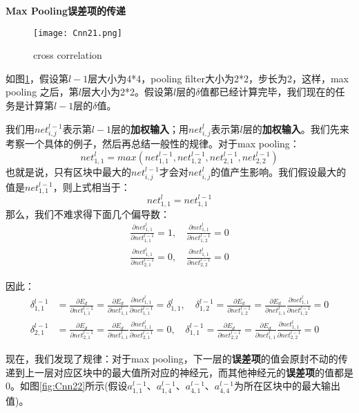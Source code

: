 \textbf{Max Pooling误差项的传递}

\begin{figure}[!h]
	\centering
	\texttt{[image: Cnn21.png]}
	\caption{cross correlation}
	\label{fig:Cnn21}
\end{figure}

如图\ref{fig:Cnn21}，假设第\(l-1\)层大小为4*4，pooling filter大小为2*2，步长为2，这样，max pooling 之后，第\(l\)层大小为2*2。假设第\(l\)层的\(\delta\)值都已经计算完毕，我们现在的任务是计算第\(l-1\)层的\(\delta\)值。


我们用\(net^{l-1}_{i,j}\)表示第\(l-1\)层的\textbf{加权输入}；用\(net^l_{i,j}\)表示第\(l\)层的\textbf{加权输入}。我们先来考察一个具体的例子，然后再总结一般性的规律。对于max pooling：
\[
	net^l_{1,1}=max(net^{l-1}_{1,1},net^{l-1}_{1,2},net^{l-1}_{2,1},net^{l-1}_{2,2})
\]
也就是说，只有区块中最大的\(net^{l-1}_{i,j}\)才会对\(net^l_{i,j}\)的值产生影响。我们假设最大的值是\(net^{l-1}_{1,1}\)，则上式相当于：
\[
	net^l_{1,1}=net^{l-1}_{1,1}
\]
那么，我们不难求得下面几个偏导数：
\begin{align*}
	\frac{\partial{net^l_{1,1}}}{\partial{net^{l-1}_{1,1}}}=1, \quad \frac{\partial{net^l_{1,1}}}{\partial{net^{l-1}_{1,2}}}=0 \\
	\frac{\partial{net^l_{1,1}}}{\partial{net^{l-1}_{2,1}}}=0, \quad \frac{\partial{net^l_{1,1}}}{\partial{net^{l-1}_{2,2}}}=0
\end{align*}

因此：
\begin{align*}
	\delta^{l-1}_{1,1} & =\frac{\partial{E_d}}{\partial{net^{l-1}_{1,1}}}=\frac{\partial{E_d}}{\partial{net^{l}_{1,1}}}\frac{\partial{net^{l}_{1,1}}}{\partial{net^{l-1}_{1,1}}}=\delta^{l}_{1,1}, \quad \delta^{l-1}_{1,2}=\frac{\partial{E_d}}{\partial{net^{l-1}_{1,2}}}=\frac{\partial{E_d}}{\partial{net^{l}_{1,1}}}\frac{\partial{net^{l}_{1,1}}}{\partial{net^{l-1}_{1,2}}}=0 \\
	\delta^{l-1}_{2,1} & =\frac{\partial{E_d}}{\partial{net^{l-1}_{2,1}}}=\frac{\partial{E_d}}{\partial{net^{l}_{1,1}}}\frac{\partial{net^{l}_{1,1}}}{\partial{net^{l-1}_{2,1}}}=0, \quad \delta^{l-1}_{1,1}=\frac{\partial{E_d}}{\partial{net^{l-1}_{2,2}}}=\frac{\partial{E_d}}{\partial{net^{l}_{1,1}}}\frac{\partial{net^{l}_{1,1}}}{\partial{net^{l-1}_{2,2}}}=0
\end{align*}

现在，我们发现了规律：对于max pooling，下一层的\textbf{误差项}的值会原封不动的传递到上一层对应区块中的最大值所对应的神经元，而其他神经元的\textbf{误差项}的值都是0。如图\ref{fig:Cnn22}所示(假设\(a^{l-1}_{1,1}\)、\(a^{l-1}_{1,4}\)、\(a^{l-1}_{4,1}\)、\(a^{l-1}_{4,4}\)为所在区块中的最大输出值)。

